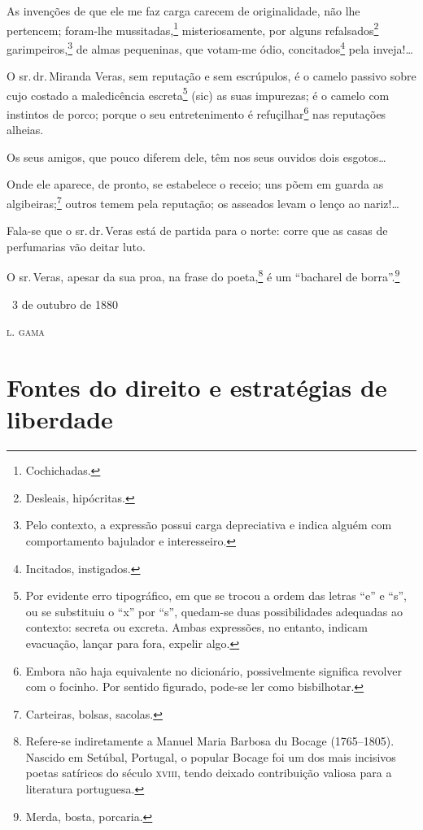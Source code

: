 {As invenções de que ele me faz carga carecem de originalidade, não lhe
pertencem; foram-lhe mussitadas,\footnote{Cochichadas.}
misteriosamente, por alguns refalsados\footnote{Desleais, hipócritas.}
garimpeiros,\footnote{Pelo contexto, a expressão possui carga
  depreciativa e indica alguém com comportamento bajulador e
  interesseiro.} de almas pequeninas, que votam-me ódio,
concitados\footnote{Incitados, instigados.} pela inveja!\ldots{}

O sr.\,dr.\,Miranda Veras, sem reputação e sem escrúpulos, é o camelo
passivo sobre cujo costado a maledicência escreta\footnote{Por
  evidente erro tipográfico, em que se trocou a ordem das letras ``e'' e
  ``s'', ou se substituiu o ``x'' por ``s'', quedam-se duas possibilidades
  adequadas ao contexto: secreta ou excreta. Ambas expressões, no
  entanto, indicam evacuação, lançar para fora, expelir algo.} (sic) as
suas impurezas; é o camelo com instintos de porco; porque o seu
entretenimento é refuçilhar\footnote{Embora não haja equivalente no
  dicionário, possivelmente significa revolver com o focinho. Por
  sentido figurado, pode-se ler como bisbilhotar.} nas reputações
alheias.

Os seus amigos, que pouco diferem dele, têm nos seus ouvidos dois
esgotos\ldots{}

Onde ele aparece, de pronto, se estabelece o receio; uns põem em guarda
as algibeiras;\footnote{Carteiras, bolsas, sacolas.} outros temem pela
reputação; os asseados levam o lenço ao nariz!\ldots{}

Fala-se que o sr.\,dr.\,Veras está de partida para o norte: corre que as %
casas de perfumarias vão deitar luto.

O sr.\,Veras, apesar da sua proa, na frase do poeta,\footnote{Refere-se
  indiretamente a Manuel Maria Barbosa du Bocage (1765--1805). Nascido em
  Setúbal, Portugal, o popular Bocage foi um dos mais incisivos poetas
  satíricos do século \textsc{xviii}, tendo deixado contribuição valiosa para a
  literatura portuguesa.} é um ``bacharel de borra''.\footnote{Merda,
  bosta, porcaria.}\medskip

\hfill\ 3 de outubro de 1880

\hfill\textsc{l. gama}

\part{Fontes do direito e estratégias de liberdade}

}
